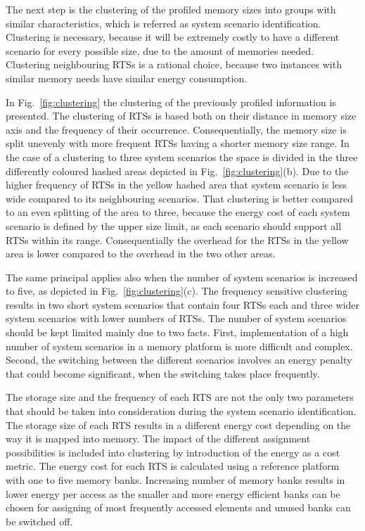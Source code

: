 \documentclass[a4paper,conference]{IEEEtran}
\begin{document}
The next step is the clustering of the profiled memory sizes into groups with similar characteristics, which is referred as system scenario identification. Clustering is necessary, because it will be extremely costly to have a different scenario for every possible size, due to the amount of memories needed. Clustering neighbouring RTSs is a rational choice, because two instances with similar memory needs have similar energy consumption. 

In Fig.~\ref{fig:clustering} the clustering of the previously profiled information is presented. The clustering of RTSs is based both on their distance in memory size axis and the frequency of their occurrence. Consequentially, the memory size is split unevenly with more frequent RTSs having a shorter memory size range. In the case of a clustering to three system scenarios the space is divided in the three differently coloured hashed areas depicted in Fig.~\ref{fig:clustering}(b). Due to the higher frequency of RTSs in the yellow hashed area that system scenario is less wide compared to its neighbouring scenarios. That clustering is better compared to an even splitting of the area to three, because the energy cost of each system scenario is defined by the upper size limit, as each scenario should support all RTSs within its range. Consequentially the overhead for the RTSs in the yellow area is lower compared to the overhead in the two other areas.

The same principal applies also when the number of system scenarios is increased to five, as depicted in Fig.~\ref{fig:clustering}(c). The frequency sensitive clustering results in two short system scenarios that contain four RTSs each and three wider system scenarios with lower numbers of RTSs. The number of system scenarios should be kept limited mainly due to two facts. First, implementation of a high number of system scenarios in a memory platform is more difficult and complex. Second, the switching between the different scenarios involves an energy penalty that could become significant, when the switching takes place frequently.

The storage size and the frequency of each RTS are not the only two parameters that should be taken into consideration during the system scenario identification. The storage size of each RTS results in a different energy cost depending on the way it is mapped into memory. The impact of the different assignment possibilities is included into clustering by introduction of the energy as a cost metric. The energy cost for each RTS is calculated using a reference platform with one to five memory banks. Increasing number of memory banks results in lower energy per access as the smaller and more energy efficient banks can be chosen for assigning of most frequently accessed elements and unused banks can be switched off.
\end{document}
